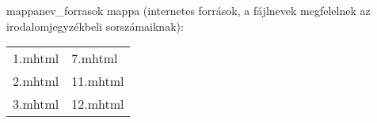 \vspace{28pt}

\noindent mappanev\_forrasok mappa (internetes források, a fájlnevek megfelelnek az irodalomjegyzékbeli sorszámaiknak):\\
\begin{tabular}{l l}
    \quad 1.mhtml & \quad\quad\quad 7.mhtml\\
    \quad 2.mhtml & \quad\quad\quad 11.mhtml\\
    \quad 3.mhtml & \quad\quad\quad 12.mhtml\\

\end{tabular}

